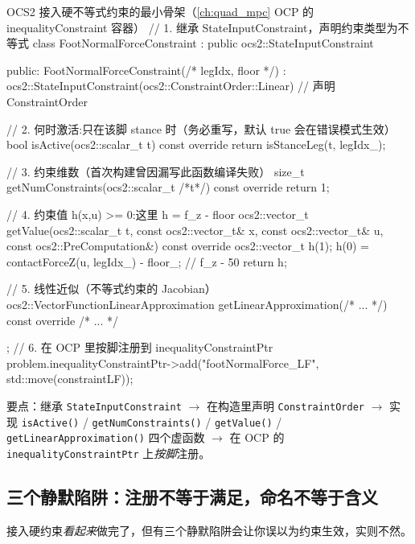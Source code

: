 \begin{codebox}[C++]{OCS2 接入硬不等式约束的最小骨架（\cref{ch:quad_mpc} OCP 的 inequalityConstraint 容器）}
// 1. 继承 StateInputConstraint，声明约束类型为不等式
class FootNormalForceConstraint : public ocs2::StateInputConstraint {
public:
  FootNormalForceConstraint(/* legIdx, floor */)
    : ocs2::StateInputConstraint(ocs2::ConstraintOrder::Linear) {}  // 声明 ConstraintOrder

  // 2. 何时激活:只在该脚 stance 时（务必重写，默认 true 会在错误模式生效）
  bool isActive(ocs2::scalar_t t) const override { return isStanceLeg(t, legIdx_); }

  // 3. 约束维数（首次构建曾因漏写此函数编译失败）
  size_t getNumConstraints(ocs2::scalar_t /*t*/) const override { return 1; }

  // 4. 约束值 h(x,u) >= 0:这里 h = f_z - floor
  ocs2::vector_t getValue(ocs2::scalar_t t, const ocs2::vector_t& x,
                          const ocs2::vector_t& u, const ocs2::PreComputation&) const override {
    ocs2::vector_t h(1);
    h(0) = contactForceZ(u, legIdx_) - floor_;   // f_z - 50
    return h;
  }

  // 5. 线性近似（不等式约束的 Jacobian）
  ocs2::VectorFunctionLinearApproximation getLinearApproximation(/* ... */) const override { /* ... */ }
};
// 6. 在 OCP 里按脚注册到 inequalityConstraintPtr
problem.inequalityConstraintPtr->add("footNormalForce_LF", std::move(constraintLF));
\end{codebox}

要点：继承 \texttt{StateInputConstraint} $\to$ 在构造里声明 \texttt{ConstraintOrder} $\to$ 实现 \texttt{isActive()} / \texttt{getNumConstraints()} / \texttt{getValue()} / \texttt{getLinearApproximation()} 四个虚函数 $\to$ 在 OCP 的 \texttt{inequalityConstraintPtr} 上\emph{按脚}注册。

\subsection{三个静默陷阱：注册不等于满足，命名不等于含义}
\label{subsec:lb-traps}

接入硬约束\emph{看起来}做完了，但有三个静默陷阱会让你误以为约束生效，实则不然。

